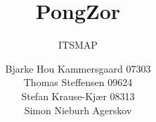 \documentclass[10pt,a4paper]{scrartcl}
\title{PongZor}
\subtitle{ITSMAP}
\author{Bjarke Hou Kammersgaard 07303\\Thomas Steffensen 09624\\Stefan Krause-Kjær 08313\\Simon Nieburh Agerskov}
\begin{document}
\maketitle
\pagebreak

\tableofcontents
\pagebreak






\end{document}
